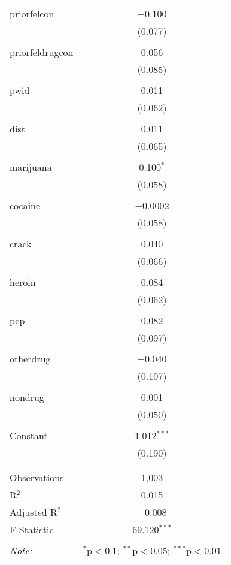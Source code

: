 \begin{table}[!htbp]
\begin{tabular}{@{\extracolsep{5pt}}lc}
 priorfelcon & $-$0.100 \\ 
  & (0.077) \\ 
  & \\ 
 priorfeldrugcon & 0.056 \\ 
  & (0.085) \\ 
  & \\ 
 pwid & 0.011 \\ 
  & (0.062) \\ 
  & \\ 
 dist & 0.011 \\ 
  & (0.065) \\ 
  & \\ 
 marijuana & 0.100$^{*}$ \\ 
  & (0.058) \\ 
  & \\ 
 cocaine & $-$0.0002 \\ 
  & (0.058) \\ 
  & \\ 
 crack & 0.040 \\ 
  & (0.066) \\ 
  & \\ 
 heroin & 0.084 \\ 
  & (0.062) \\ 
  & \\ 
 pcp & 0.082 \\ 
  & (0.097) \\ 
  & \\ 
 otherdrug & $-$0.040 \\ 
  & (0.107) \\ 
  & \\ 
 nondrug & 0.001 \\ 
  & (0.050) \\ 
  & \\ 
 Constant & 1.012$^{***}$ \\ 
  & (0.190) \\ 
  & \\ 
\hline \\[-1.8ex] 
Observations & 1,003 \\ 
R$^{2}$ & 0.015 \\ 
Adjusted R$^{2}$ & $-$0.008 \\ 
F Statistic & 69.120$^{***}$ \\ 
\hline 
\hline \\[-1.8ex] 
\textit{Note:}  & \multicolumn{1}{r}{$^{*}$p$<$0.1; $^{**}$p$<$0.05; $^{***}$p$<$0.01} \\ 
\end{tabular} 
\end{table} 
